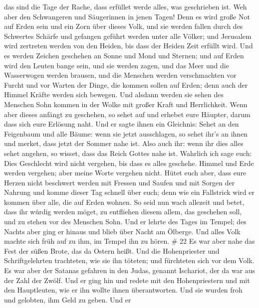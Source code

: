 das sind die Tage der Rache, dass erfüllet werde alles, was geschrieben
ist.  Weh aber den Schwangeren und Säugerinnen in jenen
Tagen! Denn es wird große Not auf Erden sein und ein Zorn über dieses
Volk,  und sie werden fallen durch des Schwertes Schärfe
und gefangen geführt werden unter alle Völker; und Jerusalem wird
zertreten werden von den Heiden, bis dass der Heiden Zeit erfüllt wird.
 Und es werden Zeichen geschehen an Sonne und Mond und
Sternen; und auf Erden wird den Leuten bange sein, und sie werden zagen,
und das Meer und die Wasserwogen werden brausen,  und die
Menschen werden verschmachten vor Furcht und vor Warten der Dinge, die
kommen sollen auf Erden; denn auch der Himmel Kräfte werden sich
bewegen.  Und alsdann werden sie sehen des Menschen Sohn
kommen in der Wolke mit großer Kraft und Herrlichkeit. 
Wenn aber dieses anfängt zu geschehen, so sehet auf und erhebet eure
Häupter, darum dass sich eure Erlösung naht.  Und er sagte
ihnen ein Gleichnis: Sehet an den Feigenbaum und alle Bäume:
 wenn sie jetzt ausschlagen, so sehet ihr's an ihnen und
merket, dass jetzt der Sommer nahe ist.  Also auch ihr:
wenn ihr dies alles sehet angehen, so wisset, dass das Reich Gottes nahe
ist.  Wahrlich ich sage euch: Dies Geschlecht wird nicht
vergehen, bis dass es alles geschehe.  Himmel und Erde
werden vergehen; aber meine Worte vergehen nicht.  Hütet
euch aber, dass eure Herzen nicht beschwert werden mit Fressen und
Saufen und mit Sorgen der Nahrung und komme dieser Tag schnell über
euch;  denn wie ein Fallstrick wird er kommen über alle,
die auf Erden wohnen.  So seid nun wach allezeit und betet,
dass ihr würdig werden möget, zu entfliehen diesem allem, das geschehen
soll, und zu stehen vor des Menschen Sohn.  Und er lehrte
des Tages im Tempel; des Nachts aber ging er hinaus und blieb über Nacht
am Ölberge.  Und alles Volk machte sich früh auf zu ihm, im
Tempel ihn zu hören. \# 22  Es war aber nahe das Fest der
süßen Brote, das da Ostern heißt.  Und die Hohenpriester und
Schriftgelehrten trachteten, wie sie ihn töteten; und fürchteten sich
vor dem Volk.  Es war aber der Satanas gefahren in den
Judas, genannt Ischariot, der da war aus der Zahl der Zwölf.
 Und er ging hin und redete mit den Hohenpriestern und mit
den Hauptleuten, wie er ihn wollte ihnen überantworten.  Und
sie wurden froh und gelobten, ihm Geld zu geben.  Und er
